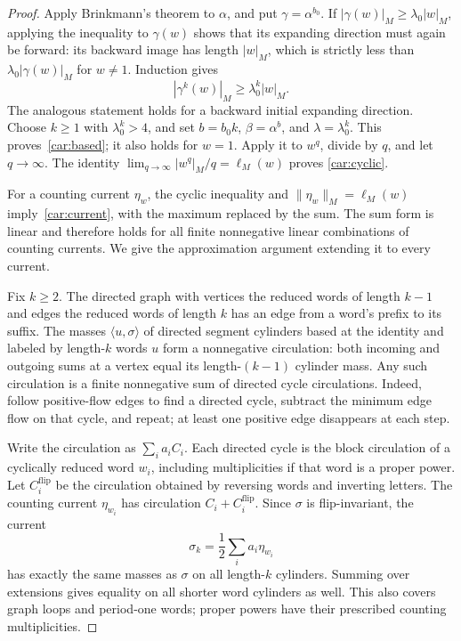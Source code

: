 \begin{proof}
Apply Brinkmann's theorem to $\alpha$, and put
$\gamma=\alpha^{b_0}$.  If
$|\gamma(w)|_M\ge\lambda_0|w|_M$, applying the inequality to
$\gamma(w)$ shows that its expanding direction must again be
forward: its backward image has length $|w|_M$, which is strictly
less than $\lambda_0|\gamma(w)|_M$ for $w\ne1$.  Induction gives
\[
 |\gamma^k(w)|_M\ge\lambda_0^k|w|_M.
\]
The analogous statement holds for a backward initial expanding
direction.  Choose $k\ge1$ with $\lambda_0^k>4$, and set
$b=b_0k$, $\beta=\alpha^b$, and $\lambda=\lambda_0^k$.
This proves~\eqref{car:based}; it also holds for $w=1$.
Apply it to $w^q$, divide by $q$, and let $q\to\infty$.
The identity $\lim_{q\to\infty}|w^q|_M/q=\ell_M(w)$ proves
\eqref{car:cyclic}.

For a counting current $\eta_w$, the cyclic inequality and
$\|\eta_w\|_M=\ell_M(w)$ imply~\eqref{car:current}, with the
maximum replaced by the sum.  The sum form is linear and therefore
holds for all finite nonnegative linear combinations of counting
currents.  We give the approximation argument extending it to
every current.

Fix $k\ge2$.  The directed graph with vertices the reduced words
of length $k-1$ and edges the reduced words of length $k$ has an
edge from a word's prefix to its suffix.  The masses
$\langle u,\sigma\rangle$ of directed segment cylinders based at the
identity and labeled by length-$k$ words $u$ form a
nonnegative circulation: both incoming and outgoing sums at a
vertex equal its length-$(k-1)$ cylinder mass.  Any such circulation
is a finite nonnegative sum of directed cycle circulations.
Indeed, follow positive-flow edges to find a directed cycle,
subtract the minimum edge flow on that cycle, and repeat; at
least one positive edge disappears at each step.

Write the circulation as $\sum_i a_i C_i$.  Each directed cycle
is the block circulation of a cyclically reduced word $w_i$,
including multiplicities if that word is a proper power.  Let
$C_i^{\mathrm{flip}}$ be the circulation obtained by reversing
words and inverting letters.  The counting current $\eta_{w_i}$
has circulation $C_i+C_i^{\mathrm{flip}}$.  Since $\sigma$ is
flip-invariant, the current
\[
 \sigma_k=\frac12\sum_i a_i\eta_{w_i}
\]
has exactly the same masses as $\sigma$ on all length-$k$
cylinders.  Summing over extensions gives equality on all shorter
word cylinders as well.  This also covers graph loops and
period-one words; proper powers have their prescribed counting
multiplicities.


\end{proof}
